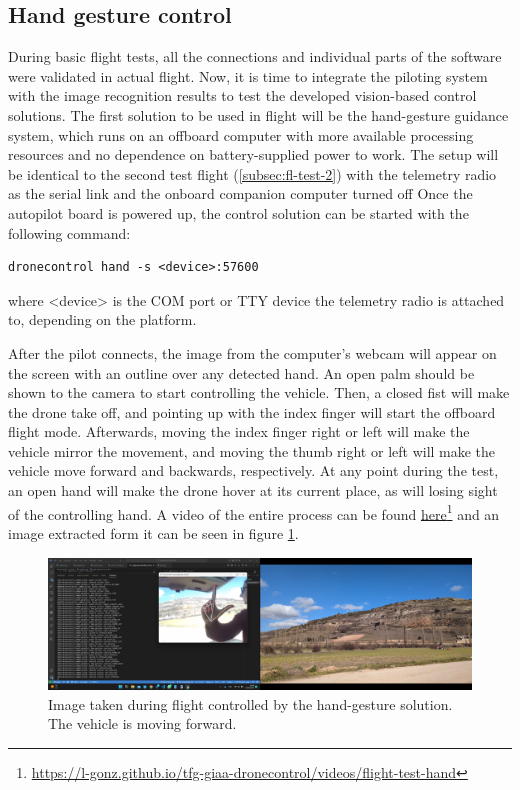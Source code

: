 \subsection{Hand gesture control}
\label{subsec:fl-test-4}


During basic flight tests, all the connections and individual parts of the software were validated in actual flight.
Now, it is time to integrate the piloting system with the image recognition results to test the developed vision-based control solutions.
The first solution to be used in flight will be the hand-gesture guidance system, which runs on an offboard computer with more available processing resources and no dependence on battery-supplied power to work.
The setup will be identical to the second test flight (\ref{subsec:fl-test-2}) with the telemetry radio as the serial link and the onboard companion computer turned off
Once the autopilot board is powered up, the control solution can be started with the following command:
\begin{verbatim}
dronecontrol hand -s <device>:57600
\end{verbatim}
where <device> is the COM port or TTY device the telemetry radio is attached to, depending on the platform.


After the pilot connects, the image from the computer's webcam will appear on the screen with an outline over any detected hand.
An open palm should be shown to the camera to start controlling the vehicle.
Then, a closed fist will make the drone take off, and pointing up with the index finger will start the offboard flight mode.
Afterwards, moving the index finger right or left will make the vehicle mirror the movement, 
and moving the thumb right or left will make the vehicle move forward and backwards, respectively.
At any point during the test, an open hand will make the drone hover at its current place, as will losing sight of the controlling hand.
A video of the entire process can be found \href{https://l-gonz.github.io/tfg-giaa-dronecontrol/videos/flight-test-hand}{here}\footnote{\url{https://l-gonz.github.io/tfg-giaa-dronecontrol/videos/flight-test-hand}} and an image extracted form it can be seen in figure \ref{fig:flight-test-hand}.

\begin{figure}
  \centering
  \includegraphics[width=\textwidth, keepaspectratio]{img/video-field-test-hand.png}
  \caption{Image taken during flight controlled by the hand-gesture solution. The vehicle is moving forward.}
  \label{fig:flight-test-hand}
\end{figure}

